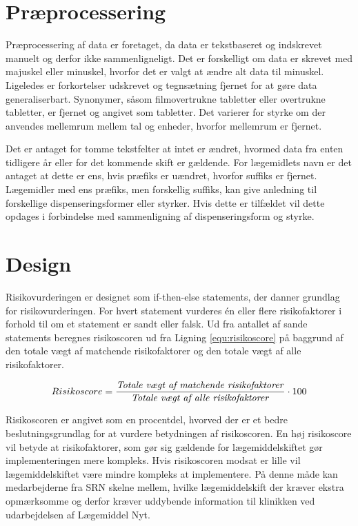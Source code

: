 \section{Præprocessering}
Præprocessering af data er foretaget, da data er tekstbaseret og indskrevet manuelt og derfor ikke sammenligneligt. Det er forskelligt om data er skrevet med majuskel eller minuskel, hvorfor det er valgt at ændre alt data til minuskel. Ligeledes er forkortelser udskrevet og tegnsætning fjernet for at gøre data generaliserbart. 
Synonymer, såsom filmovertrukne tabletter eller overtrukne tabletter, er fjernet og angivet som tabletter. 
Det varierer for styrke om der anvendes mellemrum mellem tal og enheder, hvorfor mellemrum er fjernet. 

Det er antaget for tomme tekstfelter at intet er ændret, hvormed data fra enten tidligere år eller for det kommende skift er gældende. For lægemidlets navn er det antaget at dette er ens, hvis præfiks er uændret, hvorfor suffiks er fjernet. Lægemidler med ens præfiks, men forskellig suffiks, kan give anledning til forskellige dispenseringsformer eller styrker. Hvis dette er tilfældet vil dette opdages i forbindelse med sammenligning af dispenseringsform og styrke. 

\section{Design}
Risikovurderingen er designet som if-then-else statements, der danner grundlag for risikovurderingen. For hvert statement vurderes én eller flere risikofaktorer i forhold til om et statement er sandt eller falsk. Ud fra antallet af sande statements beregnes risikoscoren ud fra Ligning \ref{equ:risikoscore} på baggrund af den totale vægt af matchende risikofaktorer og den totale vægt af alle risikofaktorer.

\begin{equation}  \label{equ:risikoscore}
Risikoscore = \frac{\mbox{\textit{Totale vægt af matchende risikofaktorer}}}{\mbox{\textit{Totale vægt af alle risikofaktorer}}} \cdot 100
\end{equation}

Risikoscoren er angivet som en procentdel, hvorved der er et bedre beslutningsgrundlag for at vurdere betydningen af risikoscoren. En høj risikoscore vil betyde at risikofaktorer, som gør sig gældende for lægemiddelskiftet gør implementeringen mere kompleks. Hvis risikoscoren modsat er lille vil lægemiddelskiftet være mindre kompleks at implementere. På denne måde kan medarbejderne fra SRN skelne mellem, hvilke lægemiddelskift der kræver ekstra opmærksomme og derfor kræver uddybende information til klinikken ved udarbejdelsen af Lægemiddel Nyt.  

